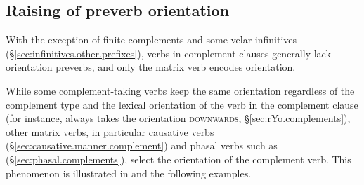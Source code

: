 \subsection{Raising of preverb orientation} \label{sec:orientation.raising}
With the exception of finite complements and some velar infinitives (§\ref{sec:infinitives.other.prefixes}), verbs in complement clauses generally lack orientation preverbs, and only the matrix verb encodes orientation.

While some complement-taking verbs keep the same orientation regardless of the complement type and the lexical orientation of the verb in the complement clause (for instance,  always takes the orientation \textsc{downwards}, §\ref{sec:rYo.complements}), other matrix verbs, in particular causative verbs (§\ref{sec:causative.manner.complement}) and phasal verbs such as    (§\ref{sec:phasal.complements}), select the orientation of the complement verb. This phenomenon is illustrated in  and the following examples.


